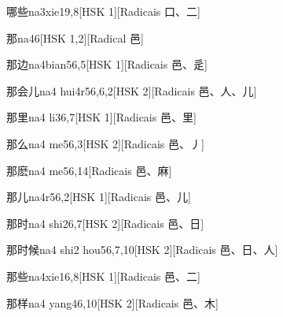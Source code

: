 \begin{entry}{哪些}{na3xie1}{9,8}[HSK 1][Radicais ⼝、⼆]
\end{entry}

\begin{entry}{那}{na4}{6}[HSK 1,2][Radical ⾢]
\end{entry}

\begin{entry}{那边}{na4bian5}{6,5}[HSK 1][Radicais ⾢、⾡]
\end{entry}

\begin{entry}{那会儿}{na4 hui4r5}{6,6,2}[HSK 2][Radicais ⾢、⼈、⼉]
\end{entry}

\begin{entry}{那里}{na4 li3}{6,7}[HSK 1][Radicais ⾢、⾥]
\end{entry}

\begin{entry}{那么}{na4 me5}{6,3}[HSK 2][Radicais ⾢、⼃]
\end{entry}

\begin{entry}{那麽}{na4 me5}{6,14}[Radicais ⾢、⿇]
\end{entry}

\begin{entry}{那儿}{na4r5}{6,2}[HSK 1][Radicais ⾢、⼉]
\end{entry}

\begin{entry}{那时}{na4 shi2}{6,7}[HSK 2][Radicais ⾢、⽇]
\end{entry}

\begin{entry}{那时候}{na4 shi2 hou5}{6,7,10}[HSK 2][Radicais ⾢、⽇、⼈]
\end{entry}

\begin{entry}{那些}{na4xie1}{6,8}[HSK 1][Radicais ⾢、⼆]
\end{entry}

\begin{entry}{那样}{na4 yang4}{6,10}[HSK 2][Radicais ⾢、⽊]
\end{entry}

